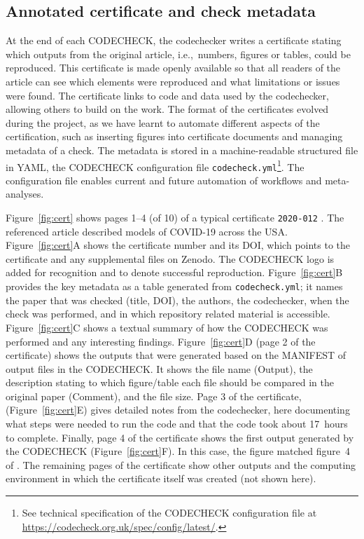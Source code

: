 \documentclass[12pt]{article}
\begin{document}
\subsection*{Annotated certificate and check metadata}\label{annotated-certificate}

At the end of each CODECHECK, the codechecker writes a certificate
stating which outputs from the original article, i.e.,~numbers,
figures or tables, could be reproduced.  This certificate is made
openly available so that all readers of the article can see which
elements were reproduced and what limitations or issues were found.
The certificate links to code and data used by the codechecker,
allowing others to build on the work.  The format of the certificates
evolved during the project, as we have learnt to automate different
aspects of the certification, such as inserting figures into
certificate documents and managing metadata of a check.  The metadata
is stored in a machine-readable structured file in YAML, the CODECHECK
configuration file \texttt{codecheck.yml}\footnote{ See technical
  specification of the CODECHECK configuration file at
  \url{https://codecheck.org.uk/spec/config/latest/}.}.  The
configuration file enables current and future automation of workflows
and meta-analyses.

Figure~\ref{fig:cert} shows pages 1--4 (of 10) of a typical
certificate \texttt{2020-012} \cite{cert-2020-012}.  The referenced
article \cite{unwin_report_2020} described models of COVID-19 across
the USA.  Figure~\ref{fig:cert}A shows the certificate number and its
DOI, which points to the certificate and any supplemental files on
Zenodo.  The CODECHECK logo is added for recognition and to denote
successful reproduction.  Figure~\ref{fig:cert}B provides the key
metadata as a table generated from \texttt{codecheck.yml}; it names
the paper that was checked (title, DOI), the authors, the codechecker,
when the check was performed, and in which repository related material
is accessible.  Figure~\ref{fig:cert}C shows a textual summary of how
the CODECHECK was performed and any interesting findings.
Figure~\ref{fig:cert}D (page 2 of the certificate) shows the outputs
that were generated based on the MANIFEST of output files in the
CODECHECK.  It shows the file name (Output), the description stating
to which figure/table each file should be compared in the original
paper (Comment), and the file size.  Page 3 of the certificate,
(Figure~\ref{fig:cert}E) gives detailed notes from the codechecker,
here documenting what steps were needed to run the code and that the
code took about 17~hours to complete. Finally, page 4 of the
certificate shows the first output generated by the CODECHECK
(Figure~\ref{fig:cert}F). In this case, the figure matched figure~4 of
\cite{unwin_report_2020}.  The remaining pages of the certificate show
other outputs and the computing environment in which the certificate
itself was created (not shown here).
\end{document}
